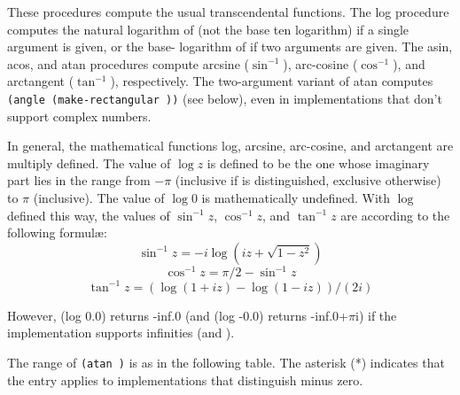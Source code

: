 \begin{entry}{
}

These procedures
compute the usual transcendental functions.  The {\cf log} procedure
computes the natural logarithm of  (not the base ten logarithm)
if a single argument is given, or the base- logarithm of 
if two arguments are given.
The {\cf asin}, {\cf acos}, and {\cf atan} procedures compute arcsine ($\sin^{-1}$),
arc-cosine ($\cos^{-1}$), and arctangent ($\tan^{-1}$), respectively.
The two-argument variant of {\cf atan} computes {\tt (angle
(make-rectangular  ))} (see below), even in implementations
that don't support complex numbers.

In general, the mathematical functions log, arcsine, arc-cosine, and
arctangent are multiply defined.
The value of $\log z$ is defined to be the one whose imaginary part
lies in the range from $-\pi$ (inclusive if {} is distinguished,
exclusive otherwise) to $\pi$ (inclusive).
The value of $\log 0$ is mathematically undefined.
With $\log$ defined this way, the values of $\sin^{-1} z$, $\cos^{-1} z$,
and $\tan^{-1} z$ are according to the following formul\ae:
$$\sin^{-1} z = -i \log (i z + \sqrt{1 - z^2})$$
$$\cos^{-1} z = \pi / 2 - \sin^{-1} z$$
$$\tan^{-1} z = (\log (1 + i z) - \log (1 - i z)) / (2 i)$$

However, {\cf (log 0.0)} returns {\cf -inf.0}
(and {\cf (log -0.0)} returns {\cf -inf.0+$\pi$i}) if the
implementation supports infinities (and {}).

The range of \texttt{({\cf atan}  )} is as in the
following table. The asterisk (*) indicates that the entry applies to
implementations that distinguish minus zero.


\end{entry}
